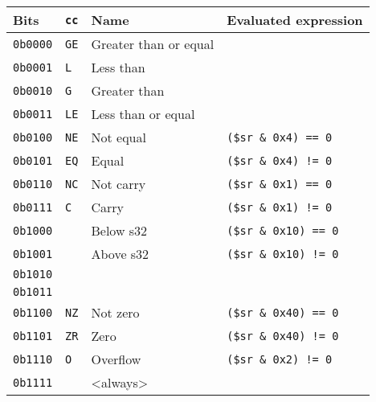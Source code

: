 \documentclass[oneside,english,a4paper,10pt,oneside,openany,final]{memoir}
\begin{document}
\begin{table}[H]
\centering
\begin{tabular}{|l|l|l|l|}
\hline
\textbf{Bits} & \textbf{\texttt{cc}} & \textbf{Name}                & \textbf{Evaluated expression} \\ \hline
\texttt{0b0000}        & \texttt{GE} & Greater than or equal        &                               \\ \hline
\texttt{0b0001}        & \texttt{L}  & Less than                    &                               \\ \hline
\texttt{0b0010}        & \texttt{G}  & Greater than                 &                               \\ \hline
\texttt{0b0011}        & \texttt{LE} & Less than or equal           &                               \\ \hline
\texttt{0b0100}        & \texttt{NE} & Not equal                    & \texttt{(\$sr \& 0x4) == 0}   \\ \hline
\texttt{0b0101}        & \texttt{EQ} & Equal                        & \texttt{(\$sr \& 0x4) != 0}   \\ \hline
\texttt{0b0110}        & \texttt{NC} & Not carry                    & \texttt{(\$sr \& 0x1) == 0}   \\ \hline
\texttt{0b0111}        & \texttt{C}  & Carry                        & \texttt{(\$sr \& 0x1) != 0}   \\ \hline
\texttt{0b1000}        &             & Below s32                    & \texttt{(\$sr \& 0x10) == 0}  \\ \hline
\texttt{0b1001}        &             & Above s32                    & \texttt{(\$sr \& 0x10) != 0}  \\ \hline
\texttt{0b1010}        &             &                              &                               \\ \hline
\texttt{0b1011}        &             &                              &                               \\ \hline
\texttt{0b1100}        & \texttt{NZ} & Not zero                     & \texttt{(\$sr \& 0x40) == 0}  \\ \hline
\texttt{0b1101}        & \texttt{ZR} & Zero                         & \texttt{(\$sr \& 0x40) != 0}  \\ \hline
\texttt{0b1110}        & \texttt{O}  & Overflow                     & \texttt{(\$sr \& 0x2) != 0}   \\ \hline
\texttt{0b1111}        &             & \textless always\textgreater &                               \\ \hline
\end{tabular}
\end{table}
\end{document}
